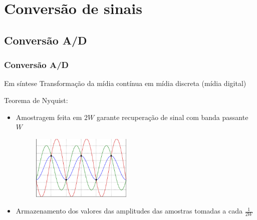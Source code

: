 \documentclass[xcolor]{beamer}
\begin{document}
\section{Conversão de sinais}
\subsection{Conversão A/D}
\begin{frame}
    \frametitle{Conversão A/D}

    Em síntese \implica Transformação da mídia contínua em mídia discreta (mídia
    digital)

    \vspace{0.25cm}

    Teorema de Nyquist:

    \begin{itemize}
        \item Amostragem feita em $2W$ garante recuperação de sinal com banda
              passante $W$
   
              \vspace{0.25cm}
    
              \begin{figure}[htb]
              \centering
                  \includegraphics[width=0.45\textwidth]{imgs/nyquist}
              \end{figure}
        \item Armazenamento dos valores das amplitudes das amostras tomadas a
              cada $\frac{1}{2W}$
    \end{itemize}
\end{frame}
\end{document}
